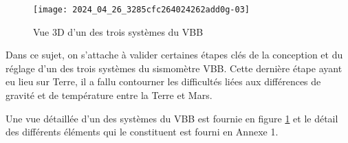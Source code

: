 \begin{figure}[!h]
\centering
\texttt{[image: 2024\_04\_26\_3285cfc264024262add0g-03]}
\caption{\label{ccmp2023_fig_02} Vue 3D d'un des trois systèmes du VBB}
\end{figure}



Dans ce sujet, on s'attache à valider certaines étapes clés de la conception et du réglage d'un des trois systèmes du sismomètre VBB. Cette dernière étape ayant eu lieu sur Terre, il a fallu contourner les difficultés liées aux différences de gravité et de température entre la Terre et Mars.

Une vue détaillée d'un des systèmes du VBB est fournie en figure \ref{ccmp2023_fig_02} et le détail des différents éléments qui le constituent est fourni en Annexe 1.
